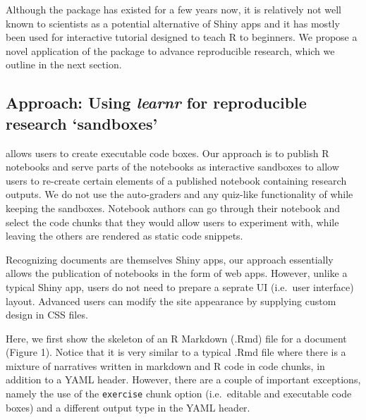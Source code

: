 Although the  package has existed for a few years now,
it is relatively not well known to scientists as a potential alternative
of Shiny apps and it has mostly been used for interactive tutorial
designed to teach R to beginners. We propose a novel application of the
 package to advance reproducible research, which we
outline in the next section.

\hypertarget{approach-using-learnr-for-reproducible-research-sandboxes}{%
\subsection{\texorpdfstring{Approach: Using \emph{learnr} for
reproducible research
`sandboxes'}{Approach: Using learnr for reproducible research `sandboxes'}}\label{approach-using-learnr-for-reproducible-research-sandboxes}}

 allows users to create executable code boxes. Our
approach is to publish R notebooks and serve parts of the notebooks as
interactive sandboxes to allow users to re-create certain elements of a
published notebook containing research outputs. We do not use the
auto-graders and any quiz-like functionality of  while
keeping the sandboxes. Notebook authors can go through their notebook
and select the code chunks that they would allow users to experiment
with, while leaving the others are rendered as static code snippets.

Recognizing  documents are themselves Shiny apps, our
approach essentially allows the publication of notebooks in the form of
web apps. However, unlike a typical Shiny app, users do not need to
prepare a seprate UI (i.e.~user interface) layout. Advanced users can
modify the site appearance by supplying custom design in CSS files.

Here, we first show the skeleton of an R Markdown (.Rmd) file for a
 document (Figure 1). Notice that it is very similar to
a typical .Rmd file where there is a mixture of narratives written in
markdown and R code in code chunks, in addition to a YAML header.
However, there are a couple of important exceptions, namely the use of
the \texttt{exercise} chunk option (i.e.~editable and executable code
boxes) and a different output type in the YAML header.

